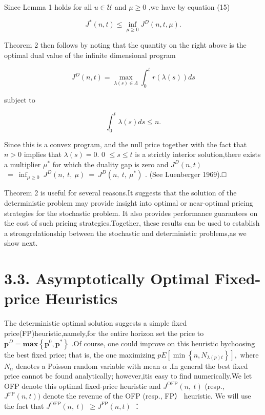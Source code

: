Since Lemma 1 holds for all \(u \in \mathcal { U }\) and \(\mu \geq 0\)
,we have by equation (15)

\[
J ^ { * } ( n , t ) \leq \operatorname * { i n f } _ { \mu \geq 0 } J ^ { D } ( n , t , \mu ) .
\]

Theorem 2 then follows by noting that the quantity on the right above is
the optimal dual value of the infinite dimensional program

\[
J ^ { D } ( n , t ) = \operatorname* { m a x } _ { \lambda ( s ) \in \Lambda } \int _ { 0 } ^ { t } r ( \lambda ( s ) ) d s
\]

subject to

\[
\int _ { 0 } ^ { t } \lambda ( s ) d s \leq n .
\]

Since this is a convex program, and the null price together with the
fact that \(n > 0\) implies that \(\lambda ( s ) = 0 .\) 0
\(\le s \le t\) is a strictly interior solution,there exists a
multiplier \(\mu ^ { * }\) for which the duality gap is zero and
\(J ^ { D } ( n , t )\)
\(\ = \ \operatorname { i n f } _ { \mu \geq 0 } \ J ^ { D } ( n , \ t , \ \mu ) \ = \ J ^ { D } ( n , \ t , \ \mu ^ { * } )\)
. (See Luenberger 1969).□

Theorem 2 is useful for several reasons.It suggests that the solution of
the deterministic problem may provide insight into optimal or
near-optimal pricing strategies for the stochastic problem. It also
provides performance guarantees on the cost of such pricing
strategies.Together, these results can be used to establish a
strongrelationship between the stochastic and deterministic problems,as
we show next.

\section{3.3. Asymptotically Optimal Fixed-price
Heuristics}\label{asymptotically-optimal-fixed-price-heuristics}

The deterministic optimal solution suggests a simple fixed
price(FP)heuristic,namely,for the entire horizon set the price to
\(\boldsymbol { p } ^ { D } = \mathbf { m } \mathbf { a } \mathbf { x } \left\{ \boldsymbol { p } ^ { 0 } , \boldsymbol { p } ^ { * } \right\}\)
.Of course, one could improve on this heuristic bychoosing the best
fixed price; that is, the one maximizing
\(p E [ \operatorname* { m i n } \left\{ n , N _ { \lambda ( p ) t } \right\} ] ,\)
where \(N _ { \alpha }\) denotes a Poisson random variable with mean
\(\alpha\) .In general the best fixed price cannot be found
analytically; however,itis easy to find numerically.We let OFP denote
this optimal fixed-price heuristic and
\(J ^ { \mathrm { O F P } } ( n , \ t )\) (resp.,
\(J ^ { \mathrm { F P } } ( n , t ) )\) denote the revenue of the OFP
(resp., FP） heuristic. We will use the fact that
\(J ^ { \mathrm { O F P } } ( n , \ t )\)
\(\geq J ^ { \mathrm { F P } } ( n , t )\) ：

